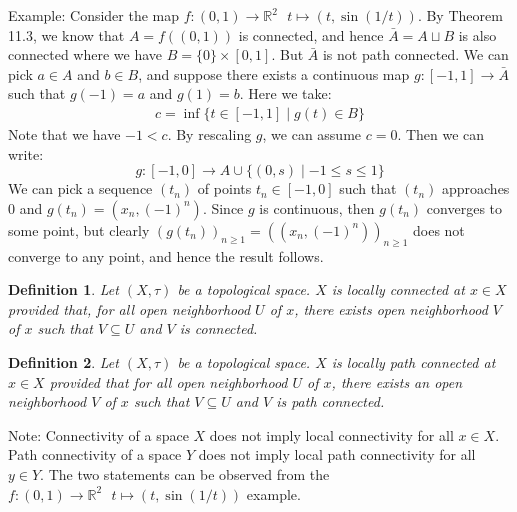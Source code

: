 \documentclass[11pt]{book}
\theoremstyle{break}
\theoremstyle{break}
\newtheorem{defn}{Definition}[corL]
\newcommand{\R}{\mathbb{R}}
\newcommand{\note}{\color{red}Note: \color{black}}
\newcommand{\example}{\color{green}Example: \color{black}}
\begin{document}
\example Consider the map $f:(0,1) \to \R^2 \ \ \ t\mapsto (t,\sin(1/t))$. By Theorem 11.3, we know that $A = f((0,1))$ is connected, and hence $\bar{A} = A\sqcup B$ is also connected where we have $B =\{0\}\times [0,1]$. But $\bar{A}$ is not path connected. We can pick $a \in A$ and $b \in B$, and suppose there exists a continuous map $g:[-1,1]\to \bar{A}$ such that $g(-1) = a$ and $g(1) = b$. Here we take:
\begin{align*}
c = \inf\{t \in [-1,1] \mid g(t)\in B\}
\end{align*}
Note that we have $-1<c$. By rescaling $g$, we can assume $c = 0$. Then we can write: 
$$g:[-1,0] \to A\cup \{(0,s) \mid -1\leq s\leq 1\}$$ 
We can pick a sequence $(t_n)$ of points $t_n\in [-1,0]$ such that $(t_n)$ approaches $0$ and $g(t_n) = (x_n, (-1)^n)$. Since $g$ is continuous, then $g(t_n)$ converges to some point, but clearly $(g(t_n))_{n\geq 1} = ((x_n, (-1)^n))_{n\geq 1}$ does not converge to any point, and hence the result follows.

\begin{defn}
Let $(X,\tau)$ be a topological space. $X$ is locally connected at $x \in X$ provided that, for all open neighborhood $U$ of $x$, there exists open neighborhood $V$ of $x$ such that $V\subseteq U$ and $V$ is connected.
\end{defn}

\begin{defn}
Let $(X,\tau)$ be a topological space. $X$ is locally path connected at $x \in X$ provided that for all open neighborhood $U$ of $x$, there exists an open neighborhood $V$ of $x$ such that $V \subseteq U$ and $V$ is path connected. 
\end{defn}

\note Connectivity of a space $X$ does not imply local connectivity for all $x \in X$. Path connectivity of a space $Y$ does not imply local path connectivity for all $y \in Y$. The two statements can be observed from the $f:(0,1) \to \R^2 \ \ \ t\mapsto (t,\sin(1/t))$ example. 
\end{document}
